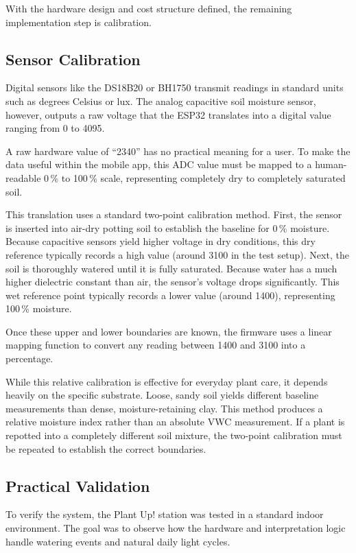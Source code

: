 With the hardware design and cost structure defined, the remaining implementation step is calibration.



\subsection{Sensor Calibration}

Digital sensors like the DS18B20 or BH1750 transmit readings in standard units such as degrees Celsius or lux. The analog capacitive soil moisture sensor, however, outputs a raw voltage that the ESP32 translates into a digital value ranging from 0 to 4095.

A raw hardware value of ``2340'' has no practical meaning for a user. To make the data useful within the mobile app, this ADC value must be mapped to a human-readable 0\,\% to 100\,\% scale, representing completely dry to completely saturated soil.

This translation uses a standard two-point calibration method. First, the sensor is inserted into air-dry potting soil to establish the baseline for 0\,\% moisture. Because capacitive sensors yield higher voltage in dry conditions, this dry reference typically records a high value (around 3100 in the test setup). Next, the soil is thoroughly watered until it is fully saturated. Because water has a much higher dielectric constant than air, the sensor's voltage drops significantly. This wet reference point typically records a lower value (around 1400), representing 100\,\% moisture.

Once these upper and lower boundaries are known, the firmware uses a linear mapping function to convert any reading between 1400 and 3100 into a percentage.

While this relative calibration is effective for everyday plant care, it depends heavily on the specific substrate. Loose, sandy soil yields different baseline measurements than dense, moisture-retaining clay. This method produces a relative moisture index rather than an absolute VWC measurement. If a plant is repotted into a completely different soil mixture, the two-point calibration must be repeated to establish the correct boundaries.



\subsection{Practical Validation}

To verify the system, the Plant Up! station was tested in a standard indoor environment. The goal was to observe how the hardware and interpretation logic handle watering events and natural daily light cycles.

